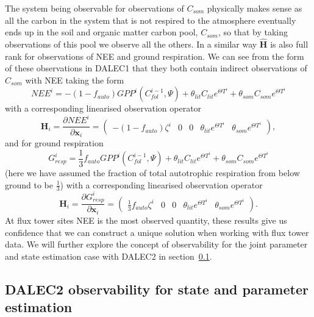 The system being observable for observations of $C_{som}$ physically makes sense as all the carbon in the system that is not respired to the atmosphere eventually ends up in the soil and organic matter carbon pool, $C_{som}$, so that by taking observations of this pool we observe all the others. In a similar way $\hat{\textbf{H}}$ is also full rank for observations of NEE and ground respiration. We can see from the form of these observations in DALEC1 that they both contain indirect observations of $C_{som}$ with NEE taking the form
\begin{equation}
NEE^{i}=-(1-f_{auto})GPP^{i}(C_{fol}^{i-1}, \Psi) + \theta_{lit}C_{lit} e^{\Theta T^{i}} + \theta_{som}C_{som} e^{\Theta T^{i}} \label{chap5:eqn: D1_nee}
\end{equation}
with a corresponding linearised observation operator
\begin{equation}
\textbf{H}_{i} = \frac{\partial NEE^{i}}{\partial \textbf{x}_{i}} =
\begin{pmatrix}
-(1-f_{auto})\zeta^i & 0 & 0 & \theta_{lit} e^{\Theta T^{i}} & \theta_{som} e^{\Theta T^{i}}
\end{pmatrix},
\end{equation}
and for ground respiration
\begin{equation}
G_{resp}^{i}=\frac{1}{3}f_{auto}GPP^{i}(C_{fol}^{i-1}, \Psi) + \theta_{lit}C_{lit} e^{\Theta T^{i}} + \theta_{som}C_{som} e^{\Theta T^{i}} \label{chap5:neeeqn}
\end{equation}
(here we have assumed the fraction of total autotrophic respiration from below ground to be $\frac{1}{3}$) with a corresponding linearised observation operator
\begin{equation}
\textbf{H}_{i} = \frac{\partial G_{resp}^{i}}{\partial \textbf{x}_{i}} =
\begin{pmatrix}
\frac{1}{3}f_{auto}\zeta^i & 0 & 0 & \theta_{lit} e^{\Theta T^{i}} & \theta_{som} e^{\Theta T^{i}}
\end{pmatrix}.
\end{equation}
At flux tower sites NEE is the most observed quantity, these results give us confidence that we can construct a unique solution when working with flux tower data. We will further explore the concept of observability for the joint parameter and state estimation case with DALEC2 in section~\ref{chap5:sec: D2_observability}. 

\subsection{DALEC2 observability for state and parameter estimation} \label{chap5:sec: D2_observability}

